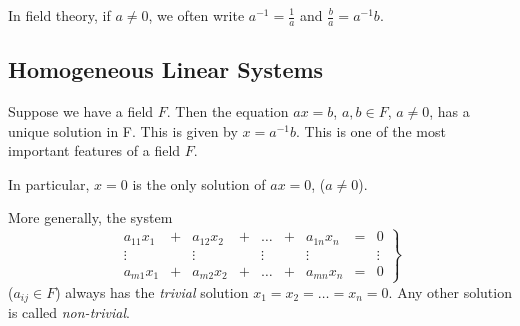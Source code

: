 \begin{notation}
	In field theory, if $a \neq 0$, we often write $a^{-1} = \frac{1}{a}$ and $\frac{b}{a} = a^{-1}b$.
\end{notation}

\subsection{Homogeneous Linear Systems}
Suppose we have a field $F$. Then the equation $ax = b$, $a, b \in F$, $a \neq 0$, has a unique solution in F. This is given by $x = a^{-1}b$. This is one of the most important features of a field $F$.

In particular, $x = 0$ is the only solution of $ax = 0$, ($a \neq 0$).

More generally, the system
\begin{equation} \label{eq:hom-system}
	\left.
	\begin{matrix}
		a_{11} x_1 &+& a_{12} x_2 &+& \ldots &+& a_{1n} x_n &=& 0 \\
		\vdots	   & & \vdots	  & & \vdots & & \vdots		& & \vdots \\
		a_{m1} x_1 &+& a_{m2} x_2 &+& \ldots &+& a_{mn} x_n &=& 0
	\end{matrix}
	\right\}
\end{equation}
($a_{ij} \in F$) always has the \emph{trivial} solution $x_1 = x_2 = \ldots = x_n = 0$. Any other solution is called \emph{non-trivial}.

